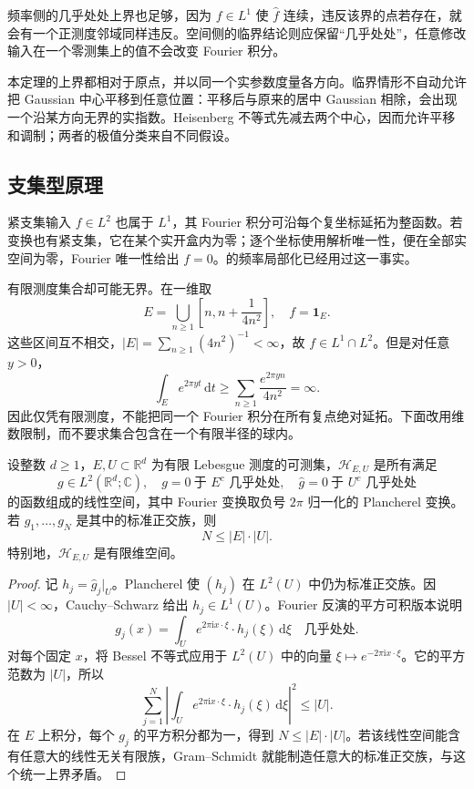 频率侧的几乎处处上界也足够，因为 \(f\in L^1\) 使 \(\widehat f\) 连续，违反该界的点若存在，就会有一个正测度邻域同样违反。空间侧的临界结论则应保留“几乎处处”，任意修改输入在一个零测集上的值不会改变 Fourier 积分。

\ProseParagraphBreak

本定理的上界都相对于原点，并以同一个实参数度量各方向。临界情形不自动允许把 Gaussian 中心平移到任意位置：平移后与原来的居中 Gaussian 相除，会出现一个沿某方向无界的实指数。Heisenberg 不等式先减去两个中心，因而允许平移和调制；两者的极值分类来自不同假设。

\subsection{支集型原理}
\label{b2:subsec:200302}

紧支集输入 \(f\in L^2\) 也属于 \(L^1\)，其 Fourier 积分可沿每个复坐标延拓为整函数。若变换也有紧支集，它在某个实开盒内为零；逐个坐标使用解析唯一性，便在全部实空间为零，Fourier 唯一性给出 \(f=0\)。的频率局部化已经用过这一事实。

\ProseParagraphBreak

有限测度集合却可能无界。在一维取
\[
 E=\bigcup_{n\geq1}\left[n,n+\frac1{4n^2}\right],
 \quad f=\mathbf1_E.
\]
这些区间互不相交，\(|E|=\sum_{n\geq1}(4n^2)^{-1}<\infty\)，故 \(f\in L^1\cap L^2\)。但是对任意 \(y>0\)，
\[
 \int_E e^{2\pi yt}\,\mathrm dt
 \geq\sum_{n\geq1}\frac{e^{2\pi yn}}{4n^2}=\infty.
\]
因此仅凭有限测度，不能把同一个 Fourier 积分在所有复点绝对延拓。下面改用维数限制，而不要求集合包含在一个有限半径的球内。

\begin{lemma}[共同支集空间的维数界]
\label{b2:lem:20-finite-support-dimension}
设整数 \(d\geq1\)，\(E,U\subset\mathbb R^d\) 为有限 Lebesgue 测度的可测集，\(\mathcal H_{E,U}\) 是所有满足
\[
 g\in L^2(\mathbb R^d;\mathbb C),
 \quad g=0\ \text{于 }E^c\text{ 几乎处处},
 \quad \widehat g=0\ \text{于 }U^c\text{ 几乎处处}
\]
的函数组成的线性空间，其中 Fourier 变换取负号 \(2\pi\) 归一化的 Plancherel 变换。若 \(g_1,\ldots,g_N\) 是其中的标准正交族，则
\[
 N\leq|E|\cdot|U|.
\]
特别地，\(\mathcal H_{E,U}\) 是有限维空间。
\end{lemma}
\begin{proof}
记 \(h_j=\widehat g_j|_U\)。Plancherel 使 \((h_j)\) 在 \(L^2(U)\) 中仍为标准正交族。因 \(|U|<\infty\)，Cauchy--Schwarz 给出 \(h_j\in L^1(U)\)。Fourier 反演的平方可积版本说明
\[
 g_j(x)=\int_Ue^{2\pi\mathrm i x\cdot\xi}\cdot h_j(\xi)\,\mathrm d\xi
 \quad\text{几乎处处}.
\]
对每个固定 \(x\)，将 Bessel 不等式应用于 \(L^2(U)\) 中的向量 \(\xi\mapsto e^{-2\pi\mathrm i x\cdot\xi}\)。它的平方范数为 \(|U|\)，所以
\[
 \sum_{j=1}^N
 \left|\int_Ue^{2\pi\mathrm i x\cdot\xi}\cdot h_j(\xi)\,\mathrm d\xi\right|^2
 \leq |U|.
\]
在 \(E\) 上积分，每个 \(g_j\) 的平方积分都为一，得到 \(N\leq|E|\cdot|U|\)。若该线性空间能含有任意大的线性无关有限族，Gram--Schmidt 就能制造任意大的标准正交族，与这个统一上界矛盾。
\end{proof}

